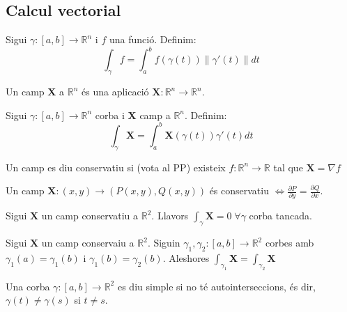 \documentclass[../main.tex]{subfiles}
\begin{document}
    \subsection{Calcul vectorial}
    \begin{definicio}
        Sigui $\gamma: [a, b] \to \mathbb{R}^n$ i $f$ una funció. Definim:
        \begin{displaymath}
            \int_\gamma f = \int_{a}^{b} f(\gamma(t)) \left\lVert \gamma'(t)\right\rVert dt
        \end{displaymath}
    \end{definicio}
    \begin{definicio}
        Un camp $\mathbf{X}$ a $\mathbb{R}^n$ és una aplicació $\mathbf{X}: \mathbb{R}^n \to \mathbb{R}^n$.
    \end{definicio}
    \begin{definicio}
        Sigui $\gamma: [a, b] \to \mathbb{R}^n$ corba i $\mathbf{X}$ camp a $\mathbb{R}^n$. Definim:
        \begin{displaymath}
            \int_\gamma \mathbf{X} = \int_{a}^{b} \mathbf{X}(\gamma(t)) \gamma'(t) dt
        \end{displaymath}
    \end{definicio}
    \begin{definicio}
        Un camp es diu conservatiu si (vota al PP) existeix $f: \mathbb{R}^n \to \mathbb{R}$ tal que
        $\mathbf{X} = \nabla f$
    \end{definicio}
    \begin{teorema}
        Un camp $\mathbf{X}: (x,y) \to (P(x,y), Q(x,y))$ és conservatiu $\Leftrightarrow \frac{\partial P}{\partial y} = \frac{\partial Q}{\partial x}$.
    \end{teorema}
    \begin{teorema}
        Sigui $\mathbf{X}$ un camp conservatiu a $\mathbb{R}^2$. Llavors $\int_\gamma \mathbf{X} = 0\; \forall \gamma$
        corba tancada. 
    \end{teorema}
    \begin{corolari}
        Sigui $\mathbf{X}$ un camp conservaiu a $\mathbb{R}^2$. Siguin $\gamma_1, \gamma_2 : [a, b] \to \mathbb{R}^2$
        corbes amb $\gamma_1\left(a\right) = \gamma_1\left(b\right)\text{ i }\gamma_1\left(b\right) = \gamma_2\left(b\right)$.
        Aleshores $\int_{\gamma_1} \mathbf{X} = \int_{\gamma_2} \mathbf{X}$
    \end{corolari}
    \begin{definicio}
        Una corba $\gamma: \left[a,b\right] \to \mathbb{R}^2$ es diu simple si no té
        autointerseccions, és dir, $\gamma\left(t\right)\neq \gamma\left(s\right)$ si $t\neq s$.
    \end{definicio}
\end{document}
